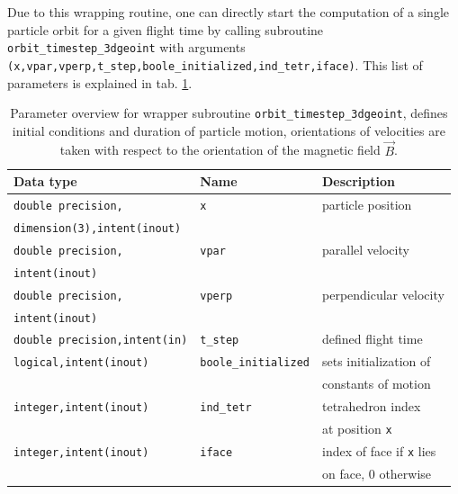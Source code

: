 \documentclass[./main.tex]{subfiles}
\begin{document}
Due to this wrapping routine, one can directly start the computation of a single particle orbit for a given flight time by calling subroutine \texttt{orbit\_timestep\_3dgeoint} with arguments \texttt{(x,vpar,vperp,t\_step,boole\_initialized,ind\_tetr,iface)}. This list of parameters is explained in tab. \ref{tab:input_orbit_timestep}.

\begin{centering}
	\begin{table}[H]
		
		\caption{Parameter overview for wrapper subroutine \texttt{orbit\_timestep\_3dgeoint}, defines initial conditions and duration of particle motion, orientations of velocities are taken with respect to the orientation of the magnetic field $\vec{B}$.}
		\begin{tabular}{|l|l|l|}
			\hline
			\rowcolor{lightgray}
			Data type&Name&Description \\
			\hline
			\texttt{double precision,}&\texttt{x}&particle position\\
			\texttt{dimension(3),intent(inout)}&&\\
			\hline
			\texttt{double precision,}&\texttt{vpar}&parallel velocity\\
			\texttt{intent(inout)}&&\\
			\hline
			\texttt{double precision,}&\texttt{vperp}&perpendicular velocity\\
			\texttt{intent(inout)}&&\\
			\hline
			\texttt{double precision,intent(in)}&\texttt{t\_step}&defined flight time\\
			\hline
			\texttt{logical,intent(inout)}&\texttt{boole\_initialized}&sets initialization of\\
			&&constants of motion\\
			\hline
			\texttt{integer,intent(inout)}&\texttt{ind\_tetr}&tetrahedron index \\
			&&at position \texttt{x}\\
			
			\hline
			\texttt{integer,intent(inout)}&\texttt{iface}&index of face if \texttt{x} lies \\
			&&on face, 0 otherwise\\
			\hline
		\end{tabular}
		\label{tab:input_orbit_timestep}	
	\end{table}
\end{centering}
\end{document}
